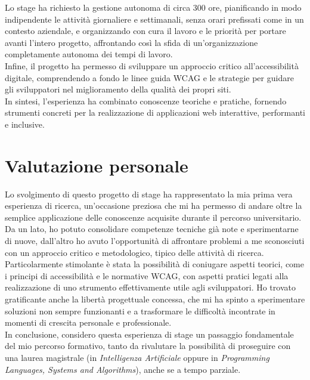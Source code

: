 Lo stage ha richiesto la gestione autonoma di circa 300 ore, pianificando in modo indipendente le attività giornaliere e settimanali, senza orari prefissati come in un contesto aziendale, e organizzando con cura il lavoro e le priorità per portare avanti l’intero progetto, affrontando così la sfida di un’organizzazione completamente autonoma dei tempi di lavoro.\\
Infine, il progetto ha permesso di sviluppare un approccio critico all’accessibilità digitale, comprendendo a fondo le linee guida WCAG e le strategie per guidare gli sviluppatori nel miglioramento della qualità dei propri siti. 
\\In sintesi, l’esperienza ha combinato conoscenze teoriche e pratiche, fornendo strumenti concreti per la realizzazione di applicazioni web interattive, performanti e inclusive.

\section{Valutazione personale}
Lo svolgimento di questo progetto di stage ha rappresentato la mia prima vera esperienza di ricerca, un’occasione preziosa che mi ha permesso di andare oltre la semplice applicazione delle conoscenze acquisite durante il percorso universitario. Da un lato, ho potuto consolidare competenze tecniche già note e sperimentarne di nuove, dall’altro ho avuto l’opportunità di affrontare problemi a me sconosciuti con un approccio critico e metodologico, tipico delle attività di ricerca. Particolarmente stimolante è stata la possibilità di coniugare aspetti teorici, come i principi di accessibilità e le normative WCAG, con aspetti pratici legati alla realizzazione di uno strumento effettivamente utile agli sviluppatori. Ho trovato gratificante anche la libertà progettuale concessa, che mi ha spinto a sperimentare soluzioni non sempre funzionanti e a trasformare le difficoltà incontrate in momenti di crescita personale e professionale. \\
In conclusione, considero questa esperienza di stage un passaggio fondamentale del mio percorso formativo, tanto da rivalutare la possibilità di proseguire con una laurea magistrale (in \textit{Intelligenza Artificiale} oppure in \textit{Programming Languages, Systems and Algorithms}), anche se a tempo parziale.